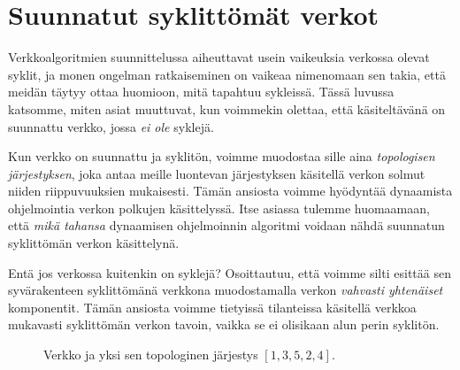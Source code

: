 \chapter{Suunnatut syklittömät verkot}

Verkkoalgoritmien suunnittelussa aiheuttavat
usein vaikeuksia verkossa olevat syklit,
ja monen ongelman ratkaiseminen on vaikeaa nimenomaan
sen takia, että meidän täytyy ottaa huomioon,
mitä tapahtuu sykleissä.
Tässä luvussa katsomme, miten asiat muuttuvat,
kun voimmekin olettaa, että käsitel\-tävänä on suunnattu verkko,
jossa \emph{ei ole} syklejä.

Kun verkko on suunnattu ja syklitön,
voimme muodostaa sille aina \emph{topologisen järjestyksen},
joka antaa meille luontevan järjestyksen käsitellä
verkon solmut niiden riippuvuuksien mukaisesti.
Tämän ansiosta voimme hyödyntää dynaamista ohjelmointia
verkon polkujen käsittelyssä.
Itse asiassa tulemme huomaamaan, että \emph{mikä tahansa}
dynaamisen ohjelmoinnin algoritmi voidaan nähdä
suunnatun syklittömän verkon käsittelynä.

Entä jos verkossa kuitenkin on syklejä?
Osoittautuu, että voimme silti esittää sen syvärakenteen
syklittömänä verkkona muodostamalla verkon
\emph{vahvasti yhtenäiset} komponentit.
Tämän ansiosta voimme tietyissä tilanteissa käsitellä
verkkoa mukavasti syklittömän verkon tavoin,
vaikka se ei olisikaan alun perin syklitön.

\begin{figure}[ht]
\center
\begin{center}
\end{center}
\caption{Verkko ja yksi sen topologinen järjestys $[1,3,5,2,4]$.}
\label{fig:topjar}
\end{figure}

